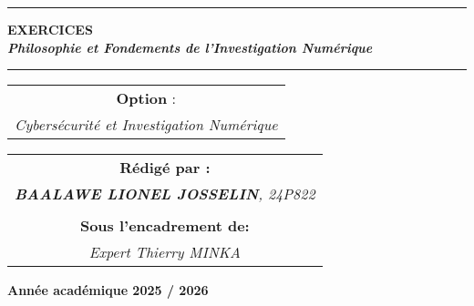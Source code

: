 \documentclass[memoire, 12pt]{report}
\begin{document}
\begin{titlepage}
\begin{center}
		\vspace{0.5cm}
		\begin{tabular}{l*{40}{@{\hskip 3.5cm}c@{\hskip5cm}} p{3.5cm} r}
		\end{tabular}
		
		\noindent\rule{\textwidth}{0.7mm}
		\Large{{\textbf{EXERCICES}}}\\
		\Large{{\textbf{\textit{Philosophie et Fondements de l’Investigation Numérique}}}}
		\noindent\rule{\textwidth}{0.7mm}
	\end{center}
		
	\begin{center}
	\begin{tabular}{c}
		
		\vspace{0.1cm}
		\normalsize
	
	
		\vspace{1cm}
		\normalsize\textbf{Option }:\\
		\normalsize				
		\textsl{Cybersécurité et Investigation Numérique}
		
	\end{tabular}
	\end{center}
		
	\begin{center}
		\normalsize %
		\begin{tabular}{c}
			\vspace{0.07cm}
			\hspace{0.02cm} \textbf{\textbf{Rédigé par :}}\\
			\hspace{0.02cm} \textsl{\textbf{BAALAWE LIONEL JOSSELIN}, 24P822}\\\\
			\vspace{0.1cm}
			\hspace{0.02cm} \textbf{Sous l'encadrement de:}\\
			\hspace{0.02cm} \textsl{Expert Thierry MINKA}\\
				
               
		\end{tabular}
	\end{center}
    
	\vspace{4cm}
	\begin{center}
		\textbf{Année académique 2025 / 2026}
	\end{center}
		

\end{titlepage}
\end{document}
